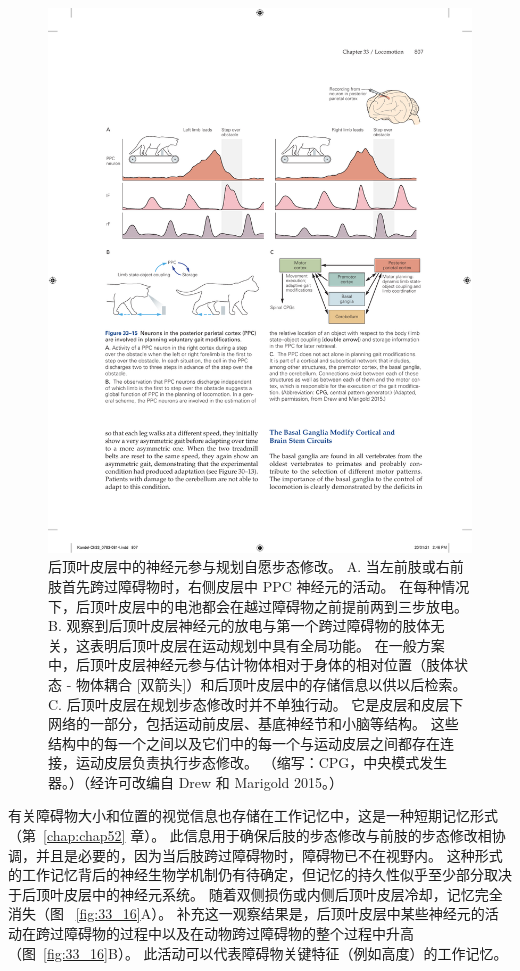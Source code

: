 \begin{figure}[htbp]
	\centering
	\includegraphics[width=0.95\linewidth]{chap33/fig_33_15}
	\caption{后顶叶皮层中的神经元参与规划自愿步态修改。 A. 当左前肢或右前肢首先跨过障碍物时，右侧皮层中 PPC 神经元的活动。 在每种情况下，后顶叶皮层中的电池都会在越过障碍物之前提前两到三步放电。 B. 观察到后顶叶皮层神经元的放电与第一个跨过障碍物的肢体无关，这表明后顶叶皮层在运动规划中具有全局功能。 在一般方案中，后顶叶皮层神经元参与估计物体相对于身体的相对位置（肢体状态 - 物体耦合 [双箭头]）和后顶叶皮层中的存储信息以供以后检索。 C. 后顶叶皮层在规划步态修改时并不单独行动。 它是皮层和皮层下网络的一部分，包括运动前皮层、基底神经节和小脑等结构。 这些结构中的每一个之间以及它们中的每一个与运动皮层之间都存在连接，运动皮层负责执行步态修改。 （缩写：CPG，中央模式发生器。）（经许可改编自 Drew 和 Marigold 2015。）}
	\label{fig:33_15}
\end{figure}


有关障碍物大小和位置的视觉信息也存储在工作记忆中，这是一种短期记忆形式（第~\ref{chap:chap52} 章）。
此信息用于确保后肢的步态修改与前肢的步态修改相协调，并且是必要的，因为当后肢跨过障碍物时，障碍物已不在视野内。
这种形式的工作记忆背后的神经生物学机制仍有待确定，但记忆的持久性似乎至少部分取决于后顶叶皮层中的神经元系统。
随着双侧损伤或内侧后顶叶皮层冷却，记忆完全消失（图 ~\ref{fig:33_16}A）。
补充这一观察结果是，后顶叶皮层中某些神经元的活动在跨过障碍物的过程中以及在动物跨过障碍物的整个过程中升高（图~\ref{fig:33_16}B）。
此活动可以代表障碍物关键特征（例如高度）的工作记忆。


